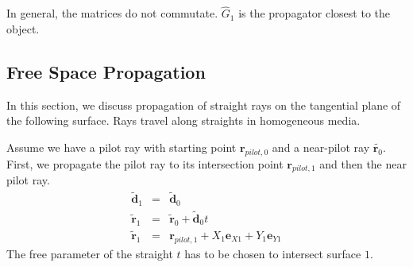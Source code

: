 \documentclass[12pt,a4paper,twoside,openright,BCOR10mm,headsepline,titlepage,abstracton,chapterprefix,final]{scrreprt}
\newcommand\Vector[1]{{\mathbf{#1}}}
\begin{document}
In general, the matrices do not commutate. $\hat{G}_1$ is the propagator closest to the object.


\subsection{Free Space Propagation}
In this section, we discuss propagation of straight rays on the tangential plane of the following surface.
Rays travel along straights in homogeneous media.

Assume we have a pilot ray with starting point $\Vector{r}_{pilot,0}$ and a near-pilot ray $\tilde{\Vector{r}_0}$.
First, we propagate the pilot ray to its intersection point $\Vector{r}_{pilot,1}$ and then the near pilot ray.
\begin{eqnarray}
 \tilde{\Vector{d}}_1 &=& \tilde{\Vector{d}}_0 \\
 \tilde{\Vector{r}}_1 &=& \tilde{\Vector{r}}_0 + \tilde{\Vector{d}}_0 t \\
 \tilde{\Vector{r}}_1 &=& \Vector{r}_{pilot,1} + X_1 \Vector{e}_{X1} + Y_1 \Vector{e}_{Y1}
\end{eqnarray}
The free parameter of the straight $t$ has to be chosen to intersect surface $1$.
\end{document}
